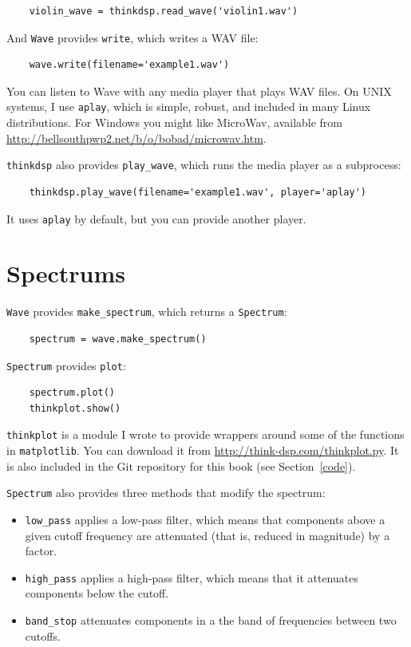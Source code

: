 \documentclass[12pt]{book}
\begin{document}
\begin{verbatim}
    violin_wave = thinkdsp.read_wave('violin1.wav')
\end{verbatim}

And {\tt Wave} provides {\tt write}, which writes a WAV file:

\begin{verbatim}
    wave.write(filename='example1.wav')
\end{verbatim}

You can listen to Wave with any media player that plays WAV
files.  On UNIX systems, I use {\tt aplay}, which is simple, robust,
and included in many Linux distributions.  For Windows you might like
MicroWav, available from
\url{http://bellsouthpwp2.net/b/o/bobad/microwav.htm}.

{\tt thinkdsp} also provides \verb"play_wave", which runs
the media player as a subprocess:

\begin{verbatim}
    thinkdsp.play_wave(filename='example1.wav', player='aplay')
\end{verbatim}

It uses {\tt aplay} by default, but you can provide another player.


\section{Spectrums}

{\tt Wave} provides \verb"make_spectrum", which returns a
{\tt Spectrum}:

\begin{verbatim}
    spectrum = wave.make_spectrum()
\end{verbatim}

{\tt Spectrum} provides {\tt plot}:

\begin{verbatim}
    spectrum.plot()
    thinkplot.show()
\end{verbatim}

{\tt thinkplot} is a module I wrote to provide wrappers around some of
the functions in {\tt matplotlib}.  You can download it from
\url{http://think-dsp.com/thinkplot.py}.  It is also included in the
Git repository for this book (see Section~\ref{code}).

{\tt Spectrum} also provides three methods that modify the spectrum:

\begin{itemize}

\item \verb"low_pass" applies a low-pass filter, which means that
  components above a given cutoff frequency are attenuated (that is,
  reduced in magnitude) by a factor.

\item \verb"high_pass" applies a high-pass filter, which means that
  it attenuates components below the cutoff.

\item \verb"band_stop" attenuates components in a the band of
frequencies between two cutoffs.

\end{itemize}
\end{document}
